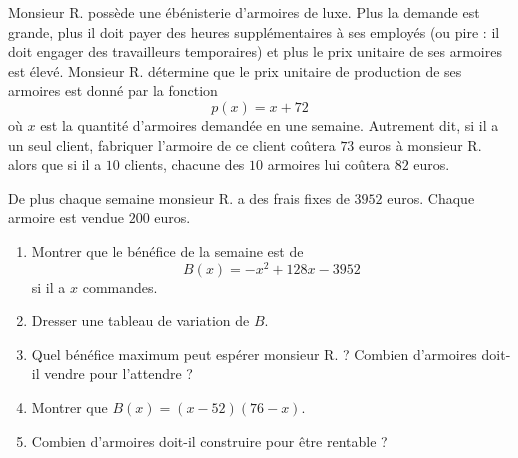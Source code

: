 
\begin{exercice}\label{exosmath-0399}

Monsieur R. possède une ébénisterie d'armoires de luxe. Plus la demande est grande, plus il doit payer des heures supplémentaires à ses employés (ou pire : il doit engager des travailleurs temporaires) et plus le prix unitaire de ses armoires est élevé. Monsieur R. détermine que le prix unitaire de production de ses armoires est donné par la fonction
\begin{equation*}
    p(x)=x+72
\end{equation*}
où \( x\) est la quantité d'armoires demandée en une semaine. Autrement dit, si il a un seul client, fabriquer l'armoire de ce client coûtera \( 73\) euros à monsieur R. alors que si il a \( 10\) clients, chacune des \( 10\) armoires lui coûtera \( 82\) euros.

De plus chaque semaine monsieur R. a des frais fixes de \( 3952\) euros. Chaque armoire est vendue \( 200\) euros.

\begin{enumerate}
    \item
        Montrer que le bénéfice de la semaine est de
        \begin{equation*}
            B(x)=-x^2+128x-3952
        \end{equation*}
        si il a \( x\) commandes.
    \item
        Dresser une tableau de variation de \( B\).
    \item
        Quel bénéfice maximum peut espérer monsieur R. ? Combien d'armoires doit-il vendre pour l'attendre ?
    \item
        Montrer que \( B(x)=(x-52)(76-x)\).
    \item
        Combien d'armoires doit-il construire pour être rentable ?
\end{enumerate}

\end{exercice}
